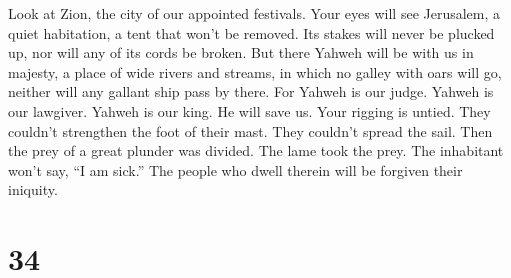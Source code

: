  Look at Zion, the city of our appointed festivals. Your
eyes will see Jerusalem, a quiet habitation, a tent that won't be
removed. Its stakes will never be plucked up, nor will any of its cords
be broken.  But there Yahweh will be with us in majesty,
a place of wide rivers and streams, in which no galley with oars will
go, neither will any gallant ship pass by there.  For
Yahweh is our judge. Yahweh is our lawgiver. Yahweh is our king. He will
save us.  Your rigging is untied. They couldn't
strengthen the foot of their mast. They couldn't spread the sail. Then
the prey of a great plunder was divided. The lame took the prey.
 The inhabitant won't say, ``I am sick.'' The people who
dwell therein will be forgiven their iniquity.

\hypertarget{section-33}{%
\section{34}\label{section-33}}

